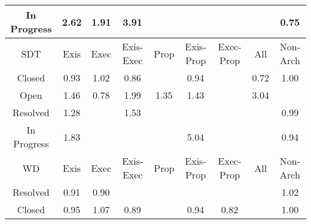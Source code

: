 \begin{tabular}{|c||c|c|c|c|c|c|c|c|}
\hline
In Progress & \cellcolor[rgb]{0.8575098742443407,0.8151362562210034,0.42} 2.62 & \cellcolor[rgb]{0.8804361242690266,0.8259960588642756,0.41999999999999993} 1.91 & \cellcolor[rgb]{0.8154756995816834,0.7952253313807974,0.42} 3.91 &  &  &  &  & \cellcolor[rgb]{0.8606900011686451,0.60659933886492,0.3739773344240688} 0.75 \\ 
\hline
\hline
SDT & Exis & Exec & Exis-Exec & Prop & Exis-Prop & Exec-Prop & All & Non-Arch \\ 
\hline
Closed & \cellcolor[rgb]{0.8962942922314728,0.7751263165623047,0.40720800608270796} 0.93 & \cellcolor[rgb]{0.9093630543969317,0.8396982889248623,0.42} 1.02 & \cellcolor[rgb]{0.8828186483056839,0.7113416019802372,0.3946307384186383} 0.86 &  & \cellcolor[rgb]{0.8981858596008702,0.7840797354441189,0.4089734689608122} 0.94 &  & \cellcolor[rgb]{0.8550515635548386,0.579910734159569,0.3687147926511826} 0.72 & \cellcolor[rgb]{0.909967857171438,0.8399847744496284,0.42} 1.00 \\ 
\hline
Open & \cellcolor[rgb]{0.8952433884613282,0.8330100261132606,0.42} 1.46 & \cellcolor[rgb]{0.8657887880504093,0.6307335967719371,0.37873620218038195} 0.78 & \cellcolor[rgb]{0.8778594528231048,0.8247755302846286,0.42} 1.99 & \cellcolor[rgb]{0.8987805353691344,0.8346855167538005,0.42} 1.35 & \cellcolor[rgb]{0.8961857971671213,0.8334564302370575,0.42} 1.43 &  & \cellcolor[rgb]{0.8439654136949007,0.8087204591186371,0.42} 3.04 &  \\ 
\hline
Resolved & \cellcolor[rgb]{0.9008780391716456,0.8356790711865689,0.42} 1.28 &  & \cellcolor[rgb]{0.8929561831506697,0.8319266130713698,0.42} 1.53 &  &  &  &  & \cellcolor[rgb]{0.9079873706873333,0.8304735545867102,0.41812154597484424} 0.99 \\ 
\hline
In Progress & \cellcolor[rgb]{0.8829259010919818,0.827175426833044,0.42} 1.83 &  &  &  & \cellcolor[rgb]{0.7790080842233987,0.777951197790031,0.42} 5.04 &  &  & \cellcolor[rgb]{0.8985601679914872,0.7858514618263728,0.4093228234587214} 0.94 \\ 
\hline
\hline
WD & Exis & Exec & Exis-Exec & Prop & Exis-Prop & Exec-Prop & All & Non-Arch \\ 
\hline
Resolved & \cellcolor[rgb]{0.8915174375278303,0.7525158709650634,0.4027496083593083} 0.91 & \cellcolor[rgb]{0.8901457010768232,0.7460229850969633,0.401469321005035} 0.90 &  &  &  &  &  & \cellcolor[rgb]{0.9094256166417433,0.8397279236724047,0.42} 1.02 \\ 
\hline
Closed & \cellcolor[rgb]{0.8991588132030516,0.7886850491611103,0.4098815589895147} 0.95 & \cellcolor[rgb]{0.9077983357477265,0.8389571064068178,0.42} 1.07 & \cellcolor[rgb]{0.8885873845854054,0.7386469537042523,0.4000148922797117} 0.89 &  & \cellcolor[rgb]{0.8984614467307107,0.7853841811920307,0.40923068361533} 0.94 & \cellcolor[rgb]{0.8745330746517257,0.672123220018168,0.3868975363416106} 0.82 &  & \cellcolor[rgb]{0.9090776349250335,0.8356341386451581,0.41913912593003116} 1.00 \\ 

\end{tabular}
